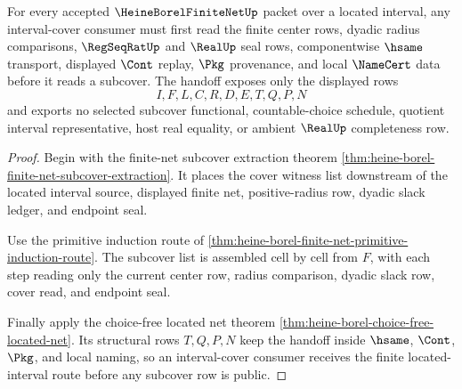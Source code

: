\begin{theorem}
\label{thm:heine-borel-finite-net-located-interval-handoff}
For every accepted $\HeineBorelFiniteNetUp$ packet over a located interval, any interval-cover consumer must first read the finite center rows, dyadic radius comparisons, $\RegSeqRatUp$ and $\RealUp$ seal rows, componentwise $\hsame$ transport, displayed $\Cont$ replay, $\Pkg$ provenance, and local $\NameCert$ data before it reads a subcover. The handoff exposes only the displayed rows
$$
I,F,L,C,R,D,E,T,Q,P,N
$$
and exports no selected subcover functional, countable-choice schedule, quotient interval representative, host real equality, or ambient $\RealUp$ completeness row.
\end{theorem}
\begin{proof}
Begin with the finite-net subcover extraction theorem \autoref{thm:heine-borel-finite-net-subcover-extraction}. It places the cover witness list downstream of the located interval source, displayed finite net, positive-radius row, dyadic slack ledger, and endpoint seal.

Use the primitive induction route of \autoref{thm:heine-borel-finite-net-primitive-induction-route}. The subcover list is assembled cell by cell from $F$, with each step reading only the current center row, radius comparison, dyadic slack row, cover read, and endpoint seal.

Finally apply the choice-free located net theorem \autoref{thm:heine-borel-choice-free-located-net}. Its structural rows $T,Q,P,N$ keep the handoff inside $\hsame$, $\Cont$, $\Pkg$, and local naming, so an interval-cover consumer receives the finite located-interval route before any subcover row is public.
\end{proof}


